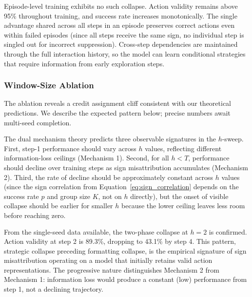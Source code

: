 Episode-level training exhibits no such collapse. Action validity remains above 95\% throughout training, and success rate increases monotonically. The single advantage shared across all steps in an episode preserves correct actions even within failed episodes (since all steps receive the same sign, no individual step is singled out for incorrect suppression). Cross-step dependencies are maintained through the full interaction history, so the model can learn conditional strategies that require information from early exploration steps.

\subsubsection{Window-Size Ablation}
\label{sec:results_hsweep}



The ablation reveals a credit assignment cliff consistent with our theoretical predictions. We describe the expected pattern below; precise numbers await multi-seed completion.

The dual mechanism theory predicts three observable signatures in the $h$-sweep. First, step-1 performance should vary across $h$ values, reflecting different information-loss ceilings (Mechanism 1). Second, for all $h < T$, performance should decline over training steps as sign misattribution accumulates (Mechanism 2). Third, the rate of decline should be approximately constant across $h$ values (since the sign correlation from Equation~\ref{eq:sign_correlation} depends on the success rate $p$ and group size $K$, not on $h$ directly), but the onset of visible collapse should be earlier for smaller $h$ because the lower ceiling leaves less room before reaching zero.

From the single-seed data available, the two-phase collapse at $h = 2$ is confirmed. Action validity at step 2 is 89.3\%, dropping to 43.1\% by step 4. This pattern, strategic collapse preceding formatting collapse, is the empirical signature of sign misattribution operating on a model that initially retains valid action representations. The progressive nature distinguishes Mechanism 2 from Mechanism 1: information loss would produce a constant (low) performance from step 1, not a declining trajectory.

